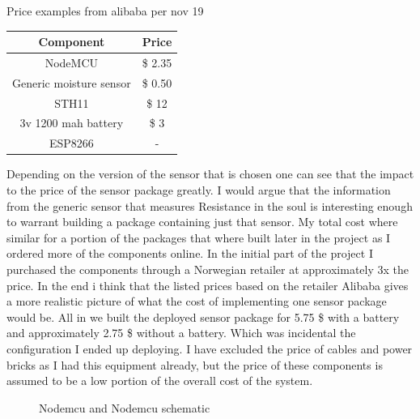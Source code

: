 \documentclass[]{uiophd}
\begin{document}
Price examples from alibaba per nov 19

\begin{center}
 \begin{tabular}{||c | c||} 
 \hline
 Component & Price \\ [0.5ex] 
 \hline\hline
 NodeMCU & \$ 2.35 \\ 
 \hline
 Generic moisture sensor & \$ 0.50 \\
 \hline
 STH11 & \$ 12 \\
 \hline
 3v 1200 mah battery & \$ 3 \\
 \hline
 ESP8266 & - \\ [1ex] 
 \hline
\end{tabular}
\end{center}

Depending on the version of the sensor that is chosen one can see that the impact to the price of the sensor package greatly. I would argue that the information from the generic sensor that measures Resistance in the soul is interesting enough to warrant building a package containing just that sensor. My total cost where similar for a portion of the packages that where built later in the project as I ordered more of the components online. In the initial part of the project I purchased the components through a Norwegian retailer at approximately 3x the price. In the end i think that the listed prices based on the retailer Alibaba gives a more realistic picture of what the cost of implementing one sensor package would be. All in we built the deployed sensor package for 5.75 \$ with a battery and approximately 2.75 \$ without a battery. Which was incidental the configuration I ended up deploying. I have excluded the price of cables and power bricks as I had this equipment already, but the price of these components is assumed to be a low portion of the overall cost of the system.


\begin{figure}[h]
\caption{Nodemcu and Nodemcu schematic}%
\centering
    \qquad
    
    \label{fig:example}%
\end{figure}
\end{document}
